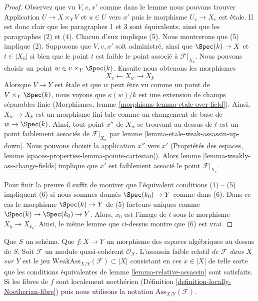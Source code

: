 \begin{proof}
Observez que vu $V, v, x'$ comme dans le lemme nous pouvons trouver
Application $U \to X \times_Y V$ et $u \in U$ vers $x'$
puis le morphisme $U_v \to X_v$ est \'étale.
Il est donc clair que les paragraphes 1 et 3 sont équivalents.
ainsi que les paragraphes (2) et (4). Chacun d'eux implique (5).
Nous montrerons que (5) implique (2).
Supposons que $V, v, x'$ soit administré, ainsi que $\Spec(k) \to X$ et $t \in |X_k|$
si bien que le point $t$ est faible
le point associé à $\mathcal{F}|_{X_k}$.
Nous pouvons choisir un point $w \in v \times_Y \Spec(k)$.
Ensuite nous obtenons les morphismes
$$
X_v \longleftarrow X_w \longrightarrow X_k
$$
Alorsque $V \to Y$ est \'étale et que $w$ peut être vu comme un point de
$V \times_Y \Spec(k)$, nous voyons que $\kappa(w)/k$
est une extension de champs séparables finie
(Morphismes, lemme \ref{morphisms-lemma-etale-over-field}).
Ainsi, $X_w \to X_k$ est un morphisme fini \'tale comme un changement de base de
$w \to \Spec(k)$. Ainsi, tout point $x''$ de $X_w$ se trouvant au-dessus de $t$
est un point faiblement associés de $\mathcal{F}|_{X_w}$ par
lemme \ref{lemma-etale-weak-assassin-up-down}.
Nous pouvons choisir la application $x''$ vers $x'$
(Propriétés des espaces, lemme \ref{spaces-properties-lemma-points-cartesian}).
Alors lemme \ref{lemma-weakly-ass-change-fields}
implique que $x'$ est faiblement associé
le point $\mathcal{F}|_{X_v}$.

\medskip\noindent
Pour finir la preuve il suffit de montrer que l'équivalent
conditions (1) -- (5) impliquent (6) si nous sommes donnés
$\Spec(k_0) \to Y$ comme dans (6). Dans ce cas le morphisme
$\Spec(k) \to Y$ de (5) facteurs uniques comme $\Spec(k) \to \Spec(k_0) \to Y$.
Alors, $x_0$ est l'image de $t$ sous le morphisme $X_k \to X_{k_0}$.
Ainsi, le même lemme que ci-dessus montre que (6) est vrai.
\end{proof}

\begin{definition}
\label{definition-relative-weak-assassin}
Que $S$ un schéma. Que $f : X \to Y$ un morphisme des espaces algébriques
au-dessus de $S$. Soit $\mathcal{F}$ un module quasi-cohérent $\mathcal{O}_X$.
L'assassin faible relatif {\it  de $\mathcal{F}$ dans $X$ sur $Y$}
est le jeu $\text{WeakAss}_{X/Y}(\mathcal{F}) \subset |X|$
consistant en ces $x \in |X|$ de telle sorte que les conditions équivalentes de
lemme \ref{lemma-relative-assassin} sont satisfaits.
Si les fibres de $f$ sont localement noethérien
(Définition \ref{definition-locally-Noetherian-fibre})
puis nous utilisons la notation $\text{Ass}_{X/Y}(\mathcal{F})$.
\end{definition}

